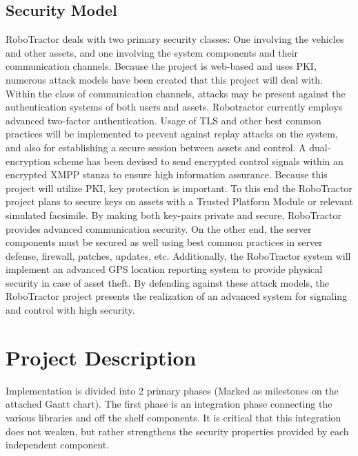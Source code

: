 \documentclass[conference,12pt]{IEEEtran}
\begin{document}
\subsection{Security Model}
RoboTractor deals with two primary security classes: One involving the vehicles
and other assets, and one involving the system components and their communication channels.
Because the project is web-based and uses PKI, numerous attack models have
been created that this project will deal with. Within the class of communication channels,
attacks may be present against the authentication systems of both users and assets. Robotractor currently employs
advanced two-factor authentication. Usage of TLS and other best common practices will be implemented to prevent
against replay attacks on the system, and also for establishing a secure session between assets and control.
A dual-encryption scheme has been devised to send encrypted control signals within an encrypted XMPP stanza
to ensure high information assurance. Because this project will utilize PKI, key protection is important. To this end
the RoboTractor project plans to secure keys on assets with a Trusted Platform Module or relevant simulated facsimile.
By making both key-pairs private and secure, RoboTractor provides advanced communication security.
On the other end, the server components must be secured as well using best common practices in server defense, firewall,
patches, updates, etc. Additionally, the RoboTractor system will implement an advanced GPS location reporting system
to provide physical security in case of asset theft. By defending against these attack models, the RoboTractor project
presents the realization of an advanced system for signaling and control with high security. 

\section{Project Description}
Implementation is divided into 2 primary phases (Marked as milestones on the
attached Gantt chart).  The first phase is an integration phase connecting
the various libraries and off the shelf components. It is critical that this
integration does not weaken, but rather strengthens the security properties
provided by each independent component. 
\end{document}
